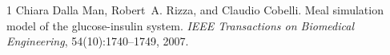 \documentclass[10pt]{article}
\begin{document}
\appendix

\begin{thebibliography}{1}
Chiara Dalla Man, Robert~A. Rizza, and Claudio Cobelli.
Meal simulation model of the glucose-insulin system.
\emph{IEEE Transactions on Biomedical Engineering}, 54(10):1740--1749, 2007.
\end{thebibliography}
\end{document}
